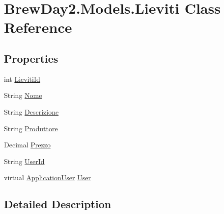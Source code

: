 \hypertarget{class_brew_day2_1_1_models_1_1_lieviti}{}\section{Brew\+Day2.\+Models.\+Lieviti Class Reference}
\label{class_brew_day2_1_1_models_1_1_lieviti}
\subsection*{Properties}
\begin{DoxyCompactItemize}
\item 
int \mbox{\hyperlink{class_brew_day2_1_1_models_1_1_lieviti_a58f88645b26701c4a32f436a8174080a}{Lieviti\+Id}}
\item 
String \mbox{\hyperlink{class_brew_day2_1_1_models_1_1_lieviti_a5b1d444b55fd41d2ae3a2d3a46533f4b}{Nome}}
\item 
String \mbox{\hyperlink{class_brew_day2_1_1_models_1_1_lieviti_aac40f7a5cbca2f0e72968cb66197cbff}{Descrizione}}
\item 
String \mbox{\hyperlink{class_brew_day2_1_1_models_1_1_lieviti_ac7187d5203129ef61df67196ed6f9131}{Produttore}}
\item 
Decimal \mbox{\hyperlink{class_brew_day2_1_1_models_1_1_lieviti_a832b4656f80a8e06422e44c026fd9412}{Prezzo}}
\item 
String \mbox{\hyperlink{class_brew_day2_1_1_models_1_1_lieviti_aaa6ddde2c056933f9e6a4ea7323416fe}{User\+Id}}
\item 
virtual \mbox{\hyperlink{class_brew_day2_1_1_models_1_1_application_user}{Application\+User}} \mbox{\hyperlink{class_brew_day2_1_1_models_1_1_lieviti_aea1e5f80769ddfaa1fed72b6d068d6f0}{User}}
\end{DoxyCompactItemize}


\subsection{Detailed Description}


